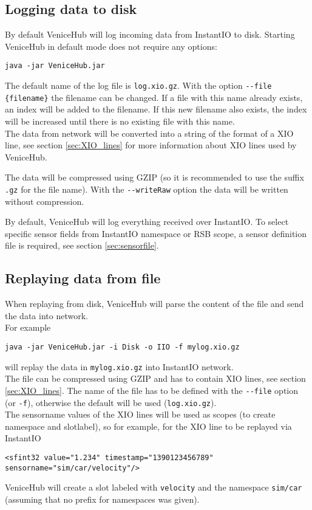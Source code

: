 \documentclass[german,a4paper]{article}
\begin{document}
\subsection{Logging data to disk}
\label{sec:target_DISK}
By default VeniceHub will log incoming data from InstantIO to disk. Starting VeniceHub in default mode does not require any options:
\begin{lstlisting}
java -jar VeniceHub.jar
\end{lstlisting}
The default name of the log file is \texttt{log.xio.gz}. With the option \texttt{-\--file \{filename\}} the filename can be changed. If a file with this name already exists, an index will be added to the filename. If this new filename also exists, the index will be increased until there is no existing file with this name.\\
The data from network will be converted into a string of the format of a XIO line, see section \ref{sec:XIO_lines} for more information about XIO lines used by VeniceHub.

The data will be compressed using GZIP (so it is recommended to use the suffix \texttt{.gz} for the file name). With the \texttt{-\--writeRaw} option the data will be written without compression.

By default, VeniceHub will log everything received over InstantIO. To select specific sensor fields from InstantIO namespace or RSB scope, a sensor definition file is required, see section \ref{sec:sensorfile}.

\subsection{Replaying data from file}
When replaying from disk, VeniceHub will parse the content of the file and send the data into network.\\
For example
\begin{lstlisting}
java -jar VeniceHub.jar -i Disk -o IIO -f mylog.xio.gz
\end{lstlisting}
will replay the data in \texttt{mylog.xio.gz} into InstantIO network.\\
The file can be compressed using GZIP and has to contain XIO lines, see section \ref{sec:XIO_lines}. The name of the file has to be defined with the \texttt{-\--file} option (or \texttt{-f}), otherwise the default will be used (\texttt{log.xio.gz}).\\
The sensorname values of the XIO lines will be used as scopes (to create namespace and slotlabel), so for example, for the XIO line to be replayed via InstantIO
\begin{lstlisting}
<sfint32 value="1.234" timestamp="1390123456789" sensorname="sim/car/velocity"/>
\end{lstlisting}
VeniceHub will create a slot labeled with \texttt{velocity} and the namespace \texttt{sim/car} (assuming that no prefix for namespaces was given).\\
\end{document}
